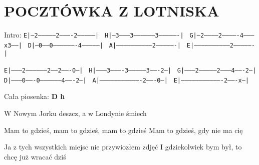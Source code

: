 \documentclass[../../../songbook.tex]{subfiles}
\begin{document}
\TabPositions{8cm} %
\section*{POCZTÓWKA Z LOTNISKA}
{}
\vspace{0.5cm}
Intro:\newline 
 \texttt{E|--2---------------2----------2---------------| } 	\newline 
 \texttt{H|--3--------3-----------------3----------------| } 	\newline 
 \texttt{G|--2------------2-------------4--------x3-----| } 	\newline 
 \texttt{D|--0------0-------------------4---------------| } 	\newline 
 \texttt{A|-----------------------------2----------------| } 	\newline 
 \texttt{E|-----------------------------2----------------| } 	\newline 

 \texttt{E|--------2------------------2------2-------0--| } 	\newline 
 \texttt{H|--------3----------3--------------3-------2--| } 	\newline 
 \texttt{G|--------2---------------2---------4-------2--| } 	\newline 
 \texttt{D|--------0-------0-----------------4-------2--| } 	\newline 
 \texttt{A|----------------------------------2-------0--| } 	\newline 
 \texttt{E|----------------------------------2-------x--| } 	\newline 

Cała piosenka: {\color{red}\textbf{D h} } \newline	

W Nowym Jorku deszcz, a w Londynie śmiech		 \newline	

\-\hspace{1cm} Mam to gdzieś, mam to gdzieś, mam to gdzieś		 \newline	
\-\hspace{1cm} Mam to gdzieś, gdy nie ma cię					 \newline	

Ja z tych wszystkich miejsc nie przywiozłem zdjęć	 \newline	
I gdziekolwiek bym był, to chcę już wracać dziś		 \newline	
\end{document}
